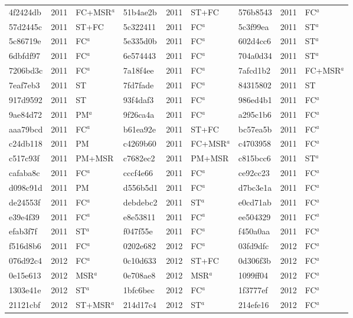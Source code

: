 \begin{longtable}{lll@{\hspace{10pt}}lll@{\hspace{10pt}}lll}
4f2424db & 2011 & FC+MSR$^{a}$ & 51b4ae2b & 2011 & ST+FC & 576b8543 & 2011 & FC$^{a}$ \\
57d2445c & 2011 & ST+FC & 5c322411 & 2011 & FC$^{a}$ & 5c3f99ea & 2011 & ST$^{a}$ \\
5c86719e & 2011 & FC$^{a}$ & 5e335d0b & 2011 & FC$^{a}$ & 602d4cc6 & 2011 & ST$^{a}$ \\
6dbfdf97 & 2011 & FC$^{a}$ & 6e574443 & 2011 & FC$^{a}$ & 704a0d34 & 2011 & ST$^{a}$ \\
7206bd3c & 2011 & FC$^{a}$ & 7a18f4ee & 2011 & FC$^{a}$ & 7afcd1b2 & 2011 & FC+MSR$^{a}$ \\
7eaf7eb3 & 2011 & ST & 7fd7fade & 2011 & FC$^{a}$ & 84315802 & 2011 & ST \\
917d9592 & 2011 & ST & 93f4daf3 & 2011 & FC$^{a}$ & 986ed4b1 & 2011 & FC$^{a}$ \\
9ae84d72 & 2011 & PM$^{a}$ & 9f26ca4a & 2011 & FC$^{a}$ & a295c1b6 & 2011 & FC$^{a}$ \\
aaa79bcd & 2011 & FC$^{a}$ & b61ea92e & 2011 & ST+FC & bc57ea5b & 2011 & FC$^{a}$ \\
c24db118 & 2011 & PM & c4269b60 & 2011 & FC+MSR$^{a}$ & c4703958 & 2011 & FC$^{a}$ \\
c517c93f & 2011 & PM+MSR & c7682ec2 & 2011 & PM+MSR & c815bcc6 & 2011 & ST$^{a}$ \\
cafaba8c & 2011 & FC$^{a}$ & cccf4e66 & 2011 & FC$^{a}$ & ce92cc23 & 2011 & FC$^{a}$ \\
d098c91d & 2011 & PM & d556b5d1 & 2011 & FC$^{a}$ & d7bc3e1a & 2011 & FC$^{a}$ \\
de24553f & 2011 & FC$^{a}$ & debdebc2 & 2011 & ST$^{a}$ & e0cd71ab & 2011 & FC$^{a}$ \\
e39e4f39 & 2011 & FC$^{a}$ & e8e53811 & 2011 & FC$^{a}$ & ee504329 & 2011 & FC$^{a}$ \\
efab3f7f & 2011 & ST$^{a}$ & f047f55e & 2011 & FC$^{a}$ & f450a0aa & 2011 & FC$^{a}$ \\
f516d8b6 & 2011 & FC$^{a}$ & 0202e682 & 2012 & FC$^{a}$ & 03fd9dfc & 2012 & FC$^{a}$ \\
076d92c4 & 2012 & FC$^{a}$ & 0c10d633 & 2012 & ST+FC & 0d306f3b & 2012 & FC$^{a}$ \\
0e15e613 & 2012 & MSR$^{a}$ & 0e708ae8 & 2012 & MSR$^{a}$ & 1099ff04 & 2012 & FC$^{a}$ \\
1303e41e & 2012 & ST$^{a}$ & 1bfc6bec & 2012 & FC$^{a}$ & 1f3777ef & 2012 & FC$^{a}$ \\
21121cbf & 2012 & ST+MSR$^{a}$ & 214d17c4 & 2012 & ST$^{a}$ & 214efe16 & 2012 & FC$^{a}$ \\

\end{longtable}
